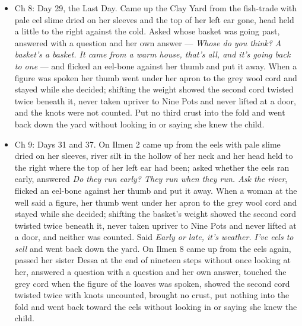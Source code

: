 \documentclass{design/chronicle}
\begin{document}
{\begin{itemize}[leftmargin=1.4em,itemsep=1pt,topsep=3pt,parsep=0pt]
\end{itemize}

\begin{itemize}[leftmargin=1.4em,itemsep=1pt,topsep=3pt,parsep=0pt]

\item Ch 8: Day 29, the Last Day. Came up the Clay Yard from the fish-trade with pale eel slime dried on her sleeves and the top of her left ear gone, head held a little to the right against the cold. Asked whose basket was going past, answered with a question and her own answer --- \emph{Whose do you think? A basket’s a basket. It came from a warm house, that’s all, and it’s going back to one} --- and flicked an eel-bone against her thumb and put it away. When a figure was spoken her thumb went under her apron to the grey wool cord and stayed while she decided; shifting the weight showed the second cord twisted twice beneath it, never taken upriver to Nine Pots and never lifted at a door, and the knots were not counted. Put no third crust into the fold and went back down the yard without looking in or saying she knew the child.

\end{itemize}

\begin{itemize}[leftmargin=1.4em,itemsep=1pt,topsep=3pt,parsep=0pt]

\item Ch 9: Days 31 and 37. On Ilmen 2 came up from the eels with pale slime dried on her sleeves, river silt in the hollow of her neck and her head held to the right where the top of her left ear had been; asked whether the eels ran early, answered \emph{Do they run early? They run when they run. Ask the river}, flicked an eel-bone against her thumb and put it away. When a woman at the well said a figure, her thumb went under her apron to the grey wool cord and stayed while she decided; shifting the basket’s weight showed the second cord twisted twice beneath it, never taken upriver to Nine Pots and never lifted at a door, and neither was counted. Said \emph{Early or late, it’s weather. I’ve eels to sell} and went back down the yard. On Ilmen 8 came up from the eels again, passed her sister Dessa at the end of nineteen steps without once looking at her, answered a question with a question and her own answer, touched the grey cord when the figure of the loaves was spoken, showed the second cord twisted twice with knots uncounted, brought no crust, put nothing into the fold and went back toward the eels without looking in or saying she knew the child.


\end{itemize}}
\end{document}
